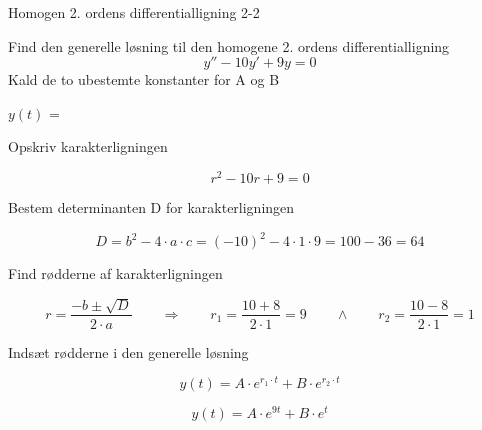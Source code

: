 \documentclass{article}
\begin{document}
\begin{exercise}{Homogen 2. ordens differentialligning 2-2}

Find den generelle løsning til den homogene 2. ordens differentialligning
\[
y'' - 10y' + 9y = 0
\]
Kald de to ubestemte konstanter for A og B

$y(t)$ = 


\hint

Opskriv karakterligningen

\hint

\[
r^2 - 10r + 9 = 0
\]


\hint

Bestem determinanten D for karakterligningen


\hint
\[
D = b^2 - 4 \cdot a \cdot c = (-10)^2 - 4 \cdot 1 \cdot 9 = 100 - 36 = 64
\]

\hint
Find rødderne af karakterligningen


\hint

\[
r = \frac{-b \pm \sqrt{D}}{2 \cdot a} \qquad \Rightarrow \qquad r_1 = \frac{10 + 8}{2 \cdot 1} = 9 \qquad \wedge \qquad r_2 = \frac{10 - 8}{2 \cdot 1} = 1
\]

\hint

Indsæt rødderne i den generelle løsning

\hint
\[
y(t) = A \cdot e^{r_1 \cdot t} + B \cdot e^{r_2\cdot t}
\]

\hint

\[
y(t) = A \cdot e^{9t} + B \cdot e^{t}
\]

\end{exercise}

\newpage
\end{document}
